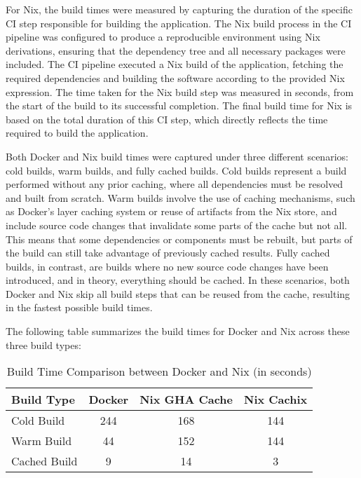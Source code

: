 For Nix, the build times were measured by capturing the duration of the specific CI step
responsible for building the application. The Nix build process in the CI pipeline was
configured to produce a reproducible environment using Nix derivations, ensuring that the
dependency tree and all necessary packages were included. The CI pipeline executed a Nix
build of the application, fetching the required dependencies and building the software
according to the provided Nix expression. The time taken for the Nix build step was measured
in seconds, from the start of the build to its successful completion. The final build time
for Nix is based on the total duration of this CI step, which directly reflects the time
required to build the application.

Both Docker and Nix build times were captured under three different scenarios: cold builds,
warm builds, and fully cached builds. Cold builds represent a build performed without any
prior caching, where all dependencies must be resolved and built from scratch. Warm builds
involve the use of caching mechanisms, such as Docker’s layer caching system or reuse of
artifacts from the Nix store, and include source code changes that invalidate some parts
of the cache but not all. This means that some dependencies or components must be rebuilt,
but parts of the build can still take advantage of previously cached results. Fully cached
builds, in contrast, are builds where no new source code changes have been introduced, and
in theory, everything should be cached. In these scenarios, both Docker and Nix skip all
build steps that can be reused from the cache, resulting in the fastest possible build times.

The following table summarizes the build times for Docker and Nix across these three build
types:

\begin{table}[H]
	\centering
	\caption{Build Time Comparison between Docker and Nix (in seconds)}
	\label{tab:build_times}
	\begin{tabular}{|l|c|c|c|}
		\hline
		\textbf{Build Type} & \textbf{Docker} & \textbf{Nix GHA Cache} & \textbf{Nix Cachix} \\
		\hline
		Cold Build          & 244             & 168                    & 144                 \\
		Warm Build          & 44              & 152                    & 144                 \\
		Cached Build        & 9               & 14                     & 3                   \\
		\hline
	\end{tabular}
\end{table}


